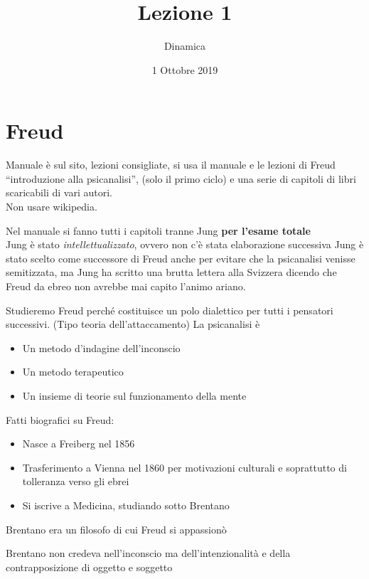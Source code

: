 \documentclass[
]{article}
\date{1 Ottobre 2019}
\title{Lezione 1}
\author{Dinamica}
\providecommand{\tightlist}{%
  \setlength{\itemsep}{0pt}\setlength{\parskip}{0pt}}
\begin{document}
\maketitle

\section{Freud}
Manuale è sul sito, lezioni consigliate, si usa il manuale e le lezioni
di Freud ``introduzione alla psicanalisi'', (solo il primo ciclo) e una
serie di capitoli di libri scaricabili di vari autori.\\
Non usare wikipedia.

Nel manuale si fanno tutti i capitoli tranne Jung \textbf{per l'esame
totale}\\
Jung è stato \emph{intellettualizzato}, ovvero non c'è stata
elaborazione successiva Jung è stato scelto come successore di Freud
anche per evitare che la psicanalisi venisse semitizzata, ma Jung ha
scritto una brutta lettera alla Svizzera dicendo che Freud da ebreo non
avrebbe mai capito l'animo ariano.

Studieremo Freud perché costituisce un polo dialettico per tutti i
pensatori successivi. (Tipo teoria dell'attaccamento) La psicanalisi è

\begin{itemize}
\tightlist
\item
  Un metodo d'indagine dell'inconscio
\item
  Un metodo terapeutico
\item
  Un insieme di teorie sul funzionamento della mente
\end{itemize}

Fatti biografici su Freud:

\begin{itemize}
\tightlist
\item
  Nasce a Freiberg nel 1856
\item
  Trasferimento a Vienna nel 1860 per motivazioni culturali e
  soprattutto di tolleranza verso gli ebrei
\item
  Si iscrive a Medicina, studiando sotto Brentano
\end{itemize}

Brentano era un filosofo di cui Freud si appassionò

Brentano non credeva nell'inconscio ma dell'intenzionalità e della
contrapposizione di oggetto e soggetto
\end{document}
